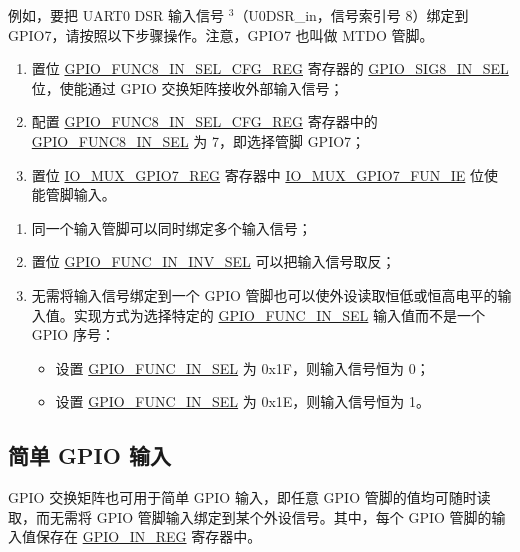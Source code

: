 \documentclass[main\_\_CN.tex]{subfiles}
\begin{document}
例如，要把 UART0 DSR 输入信号 \hyperref[input-note-3]{$^3$}（U0DSR\_in，信号索引号 8）绑定到 GPIO7，请按照以下步骤操作。注意，GPIO7 也叫做 MTDO 管脚。

\begin{enumerate}
\item 置位 \hyperref[regdesc:GPIOFUNCNINSELCFGREG]{GPIO\_FUNC8\_IN\_SEL\_CFG\_REG} 寄存器的 \hyperref[fielddesc:GPIOSIGNINSEL]{GPIO\_SIG8\_IN\_SEL} 位，使能通过 GPIO 交换矩阵接收外部输入信号；
\item 配置 \hyperref[regdesc:GPIOFUNCNINSELCFGREG]{GPIO\_FUNC8\_IN\_SEL\_CFG\_REG} 寄存器中的 \hyperref[fielddesc:GPIOFUNCNINSEL]{GPIO\_FUNC8\_IN\_SEL} 为 7，即选择管脚 GPIO7；
\item 置位 \hyperref[regdesc:IOMUXGPIONREG]{IO\_MUX\_GPIO7\_REG} 寄存器中 \hyperref[fielddesc:IOMUXGPIONFUNIE]{IO\_MUX\_GPIO7\_FUN\_IE} 位使能管脚输入。
\end{enumerate}

\begin{tiplisting}
\vspace{-2em}
\begin{enumerate}
\item \label{input-note-1} 同一个输入管脚可以同时绑定多个输入信号；
\item \label{input-note-2} 置位 \hyperref[fielddesc:GPIOFUNCNININVSEL]{GPIO\_FUNC\_IN\_INV\_SEL} 可以把输入信号取反；
\item \label{input-note-3}无需将输入信号绑定到一个 GPIO 管脚也可以使外设读取恒低或恒高电平的输入值。实现方式为选择特定的 \hyperref[fielddesc:GPIOFUNCNINSEL]{GPIO\_FUNC\_IN\_SEL} 输入值而不是一个 GPIO 序号：
\begin {itemize}
\item 设置 \hyperref[fielddesc:GPIOFUNCNINSEL]{GPIO\_FUNC\_IN\_SEL} 为 0x1F，则输入信号恒为 0；
\item 设置 \hyperref[fielddesc:GPIOFUNCNINSEL]{GPIO\_FUNC\_IN\_SEL} 为 0x1E，则输入信号恒为 1。
\end{itemize}
\end{enumerate}
\end{tiplisting}

\subsection{简单 GPIO 输入}\label{IOMUXSimpleGPIOInput}

GPIO 交换矩阵也可用于简单 GPIO 输入，即任意 GPIO 管脚的值均可随时读取，而无需将 GPIO 管脚输入绑定到某个外设信号。其中，每个 GPIO 管脚的输入值保存在 \hyperref[regdesc:GPIOINREG]{GPIO\_IN\_REG} 寄存器中。
\end{document}
